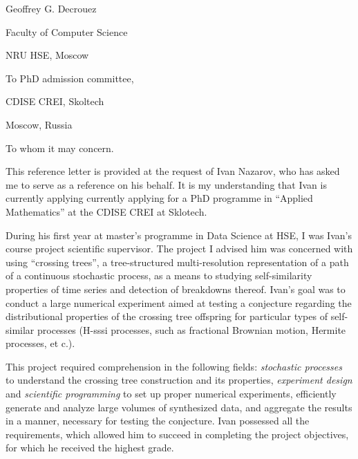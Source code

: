 \documentclass[14pt]{extarticle}
\begin{document}
\hspace*{0.55\linewidth}
\begin{minipage}{0.45\linewidth}
Geoffrey G. Decrouez \par
Faculty of Computer Science \par
NRU HSE, Moscow
\end{minipage}\par \bigskip

\begin{minipage}{0.5\linewidth}
To PhD admission committee, \par
CDISE CREI, Skoltech \par
Moscow, Russia \par
\end{minipage} \par\bigskip

To whom it may concern. \par\bigskip

This reference letter is provided at the request of Ivan Nazarov, who has asked me
to serve as a reference on his behalf. It is my understanding that Ivan is currently
applying currently applying for a PhD programme in ``Applied Mathematics'' at the
CDISE CREI at Sklotech. \par\medskip

During his first year at master's programme in Data Science at HSE, I was Ivan's
course project scientific supervisor. The project I advised him was concerned with
using ``crossing trees'', a tree-structured multi-resolution representation of a
path of a continuous stochastic process, as a means to studying self-similarity
properties of time series and detection of breakdowns thereof. Ivan's goal was to
conduct a large numerical experiment aimed at testing a conjecture regarding the
distributional properties of the crossing tree offspring for particular types of
self-similar processes (H-sssi processes, such as fractional Brownian motion,
Hermite processes, et c.). \par\medskip

This project required comprehension in the following fields: \textit{stochastic processes}
to understand the crossing tree construction and its properties, \textit{experiment
design} and \textit{scientific programming} to set up proper numerical experiments,
efficiently generate and analyze large volumes of synthesized data, and aggregate
the results in a manner, necessary for testing the conjecture. Ivan possessed all
the requirements, which allowed him to succeed in completing the project objectives,
for which he received the highest grade. \par\medskip
\end{document}
